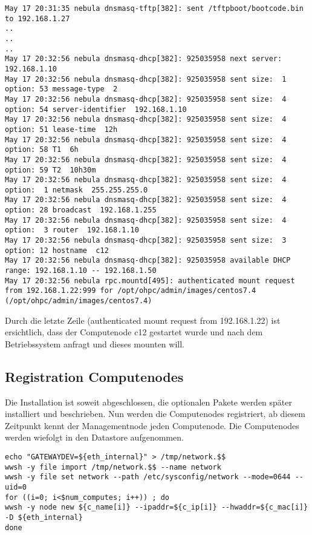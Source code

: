 \begin{lstlisting}
May 17 20:31:35 nebula dnsmasq-tftp[382]: sent /tftpboot/bootcode.bin to 192.168.1.27
..
..
..
May 17 20:32:56 nebula dnsmasq-dhcp[382]: 925035958 next server: 192.168.1.10
May 17 20:32:56 nebula dnsmasq-dhcp[382]: 925035958 sent size:  1 option: 53 message-type  2
May 17 20:32:56 nebula dnsmasq-dhcp[382]: 925035958 sent size:  4 option: 54 server-identifier  192.168.1.10
May 17 20:32:56 nebula dnsmasq-dhcp[382]: 925035958 sent size:  4 option: 51 lease-time  12h
May 17 20:32:56 nebula dnsmasq-dhcp[382]: 925035958 sent size:  4 option: 58 T1  6h
May 17 20:32:56 nebula dnsmasq-dhcp[382]: 925035958 sent size:  4 option: 59 T2  10h30m
May 17 20:32:56 nebula dnsmasq-dhcp[382]: 925035958 sent size:  4 option:  1 netmask  255.255.255.0
May 17 20:32:56 nebula dnsmasq-dhcp[382]: 925035958 sent size:  4 option: 28 broadcast  192.168.1.255
May 17 20:32:56 nebula dnsmasq-dhcp[382]: 925035958 sent size:  4 option:  3 router  192.168.1.10
May 17 20:32:56 nebula dnsmasq-dhcp[382]: 925035958 sent size:  3 option: 12 hostname  c12
May 17 20:32:56 nebula dnsmasq-dhcp[382]: 925035958 available DHCP range: 192.168.1.10 -- 192.168.1.50
May 17 20:32:56 nebula rpc.mountd[495]: authenticated mount request from 192.168.1.22:999 for /opt/ohpc/admin/images/centos7.4 (/opt/ohpc/admin/images/centos7.4)
\end{lstlisting}

Durch die letzte Zeile (authenticated mount request from 192.168.1.22) ist ersichtlich, dass der Computenode c12 gestartet wurde und nach dem Betriebssystem anfragt und dieses mounten will.

\subsection{Registration Computenodes}

Die Installation ist soweit abgeschlossen, die optionalen Pakete werden später installiert und beschrieben. Nun werden die Computenodes registriert, ab diesem Zeitpunkt kennt der Managementnode jeden Computenode. Die Computenodes werden wiefolgt in den Datastore aufgenommen.

\begin{lstlisting}
echo "GATEWAYDEV=${eth_internal}" > /tmp/network.$$
wwsh -y file import /tmp/network.$$ --name network
wwsh -y file set network --path /etc/sysconfig/network --mode=0644 --uid=0
for ((i=0; i<$num_computes; i++)) ; do
wwsh -y node new ${c_name[i]} --ipaddr=${c_ip[i]} --hwaddr=${c_mac[i]} -D ${eth_internal}
done
\end{lstlisting}
\newpage
